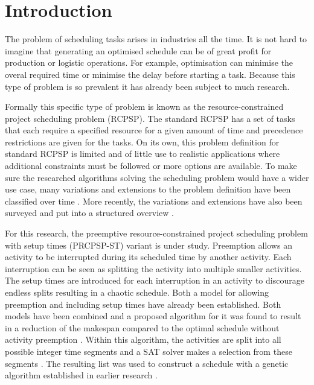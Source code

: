 \section{Introduction}
The problem of scheduling tasks arises in industries all the time. It is not hard to imagine that generating an optimised schedule can be of great profit for production or logistic operations. For example, optimisation can minimise the overal required time or minimise the delay before starting a task. Because this type of problem is so prevalent it has already been subject to much research.

Formally this specific type of problem is known as the resource-constrained project scheduling problem (RCPSP). The standard RCPSP has a set of tasks that each require a specified resource for a given amount of time and precedence restrictions are given for the tasks. On its own, this problem definition for standard RCPSP is limited and of little use to realistic applications where additional constraints must be followed or more options are available.
To make sure the researched algorithms solving the scheduling problem would have a wider use case, many variations and extensions to the problem definition have been classified over time \cite{RN9} \cite{RN10}. More recently, the variations and extensions have also been surveyed and put into a structured overview \cite{RN6}.


For this research, the preemptive resource-constrained project scheduling problem with setup times (PRCPSP-ST) variant is under study. Preemption allows an activity to be interrupted during its scheduled time by another activity. Each interruption can be seen as splitting the activity into multiple smaller activities. The setup times are introduced for each interruption in an activity to discourage endless splits resulting in a chaotic schedule. Both a model for allowing preemption \cite{RN21} and including setup times \cite{RN13} have already been established. Both models have been combined and a proposed algorithm for it was found to result in a reduction of the makespan compared to the optimal schedule without activity preemption \cite{RN1}. Within this algorithm, the activities are split into all possible integer time segments and a SAT solver makes a selection from these segments \cite{RN3}. The resulting list was used to construct a schedule with a genetic algorithm established in earlier research \cite{RN14}.

